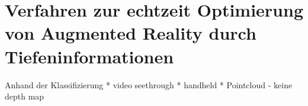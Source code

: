 \chapter{Verfahren zur echtzeit Optimierung von Augmented Reality durch Tiefeninformationen}

Anhand der Klassifizierung
* video seethrough
* handheld
* Pointcloud - keine depth map







